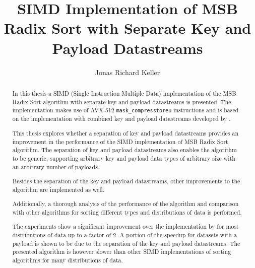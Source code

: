 \documentclass[12pt, a4paper, openright, twoside]{tiarbeit}
\title{SIMD Implementation of MSB Radix Sort with Separate Key and Payload Datastreams}
\author{Jonas Richard Keller}
\begin{document}
\raggedbottom{}
\maketitle
\begin{abstract}
  In this thesis a SIMD (Single Instruction Multiple Data) implementation of the
  MSB Radix Sort algorithm
  with separate key and payload datastreams is presented. The
  implementation makes use of AVX-512 \texttt{mask\_compresstoreu} instructions
  and is based on the implementation with combined key and payload datastreams
  developed by \citet{moeller_radix}.

  This thesis explores whether a separation
  of key and payload datastreams provides an improvement in the
  performance of the SIMD implementation of MSB Radix Sort algorithm.
  The separation
  of key and payload datastreams also enables the algorithm to be generic,
  supporting arbitrary key and payload data types of arbitrary size with an arbitrary
  number of payloads.

  Besides the separation of the key and payload datastreams, other
  improvements to the algorithm are implemented as well.

  Additionally, a thorough analysis of the performance of the algorithm and comparison
  with other algorithms for sorting different types and distributions of data
  is performed.

  The experiments show a significant improvement over
  the implementation by \citet{moeller_radix} for most distributions of data
  up to a factor of 2.
  A portion of the speedup for datasets with a payload is shown to
  be due to the separation of the key and payload datastreams.
  The presented algorithm is however slower than other SIMD implementations
  of sorting algorithms for many distributions of data.
\end{abstract}
\cleardoublepageempty
\tableofcontents
\end{document}

